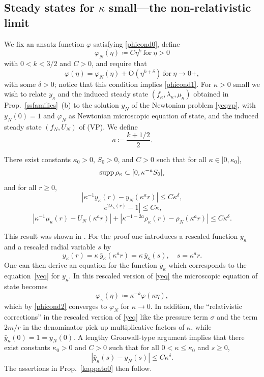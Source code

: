 \documentclass[11pt]{article}
\begin{document}
\subsection{Steady states for $\kappa$ small---the non-relativistic limit}
\label{stst_nonrel}
%
We fix an ansatz function $\varphi$ satisfying \eqref{phicond0}, define
\[
\varphi_N(\eta) \coloneqq C \eta^k\ \mbox{for}\ \eta >0
\]
with $0<k<3/2$ and $C>0$, and require that
\begin{equation}\label{phicond2}
  \varphi(\eta) = \varphi_N(\eta) + \mathrm{O}(\eta^{k+\delta})
  \ \mbox{for}\ \eta \to 0+,
\end{equation}
with some $\delta >0$; notice that this condition implies \eqref{phicond1}.
For $\kappa >0$ small we wish to relate 
$y_\kappa$ and the induced steady state
$(f_\kappa,\lambda_\kappa,\mu_\kappa)$ obtained in Prop.~\ref{ssfamilies}~(b)
to the solution $y_N$ of the Newtonian problem \eqref{yeqvp}, with
$y_N(0)=1$ and $\varphi_N$ as Newtonian microscopic
equation of state, and the induced
steady state $(f_N,U_N)$ of (VP).
We define
\[
a \coloneqq \frac{k+1/2}{2}.
\]
%
\begin{proposition}\label{kappato0}
%
  There exist constants $\kappa_0 >0$, $S_0>0$, and $C>0$ such that for all
  $\kappa \in ]0,\kappa_0]$,
  \[ 
  \mathrm{supp}\, \rho_\kappa \subset [0,\kappa^{-a}S_0],
  \]
  and for all $r\geq 0$,
  \[ 
  \left|\kappa^{-1} y_\kappa (r) -y_N (\kappa^a r)\right| \leq C \kappa^\delta,
  \]
  \[ 
  \left|e^{2\lambda_\kappa(r)} -1\right|\leq C \kappa,
  \]
  \[ 
  \left|\kappa^{-1} \mu_\kappa (r) - U_N (\kappa^a r)\right|+
  |\kappa^{-1-2a}\rho_\kappa (r) - \rho_N(\kappa^a r)| \leq C \kappa^\delta.
  \]
\end{proposition}
%
This result was shown in \cite{HaRe2014}. For the proof one
introduces a rescaled function $\bar{y}_\kappa$ 
and a rescaled radial variable $s$ by
\[ 
y_\kappa (r) = \kappa \, \bar{y}_\kappa (\kappa^a r) 
= \kappa \, \bar{y}_\kappa (s),\quad
s = \kappa^a r.
\]
One can then derive an equation for the function $\bar{y}_\kappa$
which corresponds to the equation~\eqref{yeq} for $y_\kappa$.
In this rescaled version of \eqref{yeq} the microscopic equation of state
becomes
\[
\varphi_{\kappa}(\eta) \coloneqq
\kappa^{-k}\varphi(\kappa \eta),
\]
which by \eqref{phicond2} converges to $\varphi_N$ for $\kappa \to 0$.
In addition, the ``relativistic corrections'' in the rescaled version
of \eqref{yeq} like the pressure term $\sigma$ and the term $2 m/r$
in the denominator pick up multiplicative factors of $\kappa$,
while  $\bar{y}_\kappa(0)=1=y_N(0)$. A lengthy Gronwall-type argument
implies that there exist constants $\kappa_0>0$ and $C>0$
such that for all $0<\kappa\leq \kappa_0$ and $s\geq 0$,
\[
|\bar{y}_\kappa (s) -y_N (s)| \leq C \kappa^\delta.
\]
The assertions in Prop.~\ref{kappato0} then follow.
\end{document}
